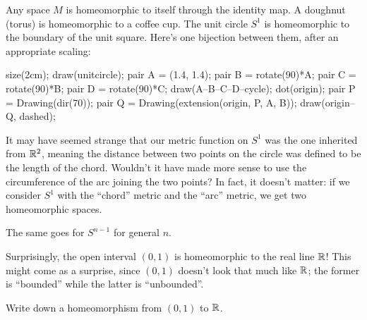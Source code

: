 \begin{example}
	\listhack
	\begin{enumerate}[(a)]
		\ii Any space $M$ is homeomorphic to itself through the identity map.
		\ii A doughnut (torus) is homeomorphic to a coffee cup.
		\ii The unit circle $S^1$ is homeomorphic to the boundary of the unit square. Here's one bijection between them, after an appropriate scaling:
		\begin{center}
			\begin{asy}
				size(2cm);
				draw(unitcircle);
				pair A = (1.4, 1.4);
				pair B = rotate(90)*A;
				pair C = rotate(90)*B;
				pair D = rotate(90)*C;
				draw(A--B--C--D--cycle);
				dot(origin);
				pair P = Drawing(dir(70));
				pair Q = Drawing(extension(origin, P, A, B));
				draw(origin--Q, dashed);
			\end{asy}
		\end{center}
	\end{enumerate}
\end{example}
\begin{example}
	It may have seemed strange that our metric function on $S^1$
	was the one inherited from $\mathbb R^2$, meaning the distance between two points
	on the circle was defined to be the length of the chord.
	Wouldn't it have made more sense to use the circumference of the arc joining
	the two points?
	In fact, it doesn't matter: if we consider $S^1$ with the ``chord'' metric
	and the ``arc'' metric, we get two homeomorphic spaces.

	The same goes for $S^{n-1}$ for general $n$.
\end{example}

\begin{example}
	Surprisingly, the open interval $(0,1)$ is homeomorphic to the real line $\mathbb R$!
	This might come as a surprise, since $(0,1)$ doesn't look that much like $\mathbb R$;
	the former is ``bounded'' while the latter is ``unbounded''.
\end{example}
\begin{exercise}
	Write down a homeomorphism from $(0,1)$ to $\mathbb R$.
\end{exercise}

